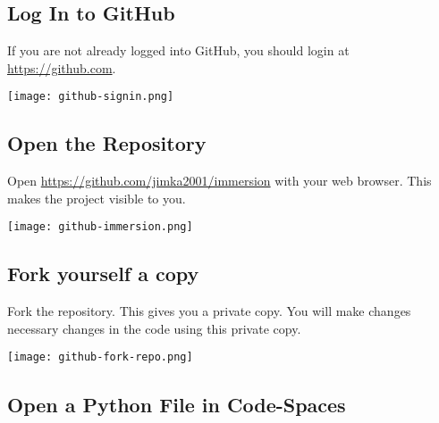 \subsection{Log In to GitHub}
\label{sec.github.login}

If you are not already logged into GitHub, you should login at \url{https://github.com}.

\noindent\texttt{[image: github-signin.png]}


\clearpage
\subsection{Open the Repository}
\label{sec.open.repo}
  


Open \url{https://github.com/jimka2001/immersion} with your web browser.  This makes the project visible to you.

\noindent\texttt{[image: github-immersion.png]}


\subsection{Fork yourself a copy}

Fork the repository.  This gives you a private copy.  You will make changes
necessary changes in the code using this private copy.

\noindent \texttt{[image: github-fork-repo.png]}



\subsection{Open a Python File in Code-Spaces}
  
